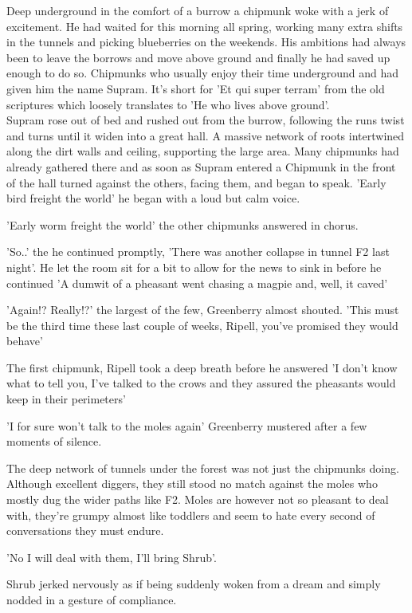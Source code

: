 \documentclass[smalldemyvopaper,11pt,twoside,onecolumn,openright,extrafontsizes]{memoir}
\begin{document}
Deep underground in the comfort of a burrow	a chipmunk woke with a jerk of excitement. He had waited for this morning all spring, working many extra shifts in the tunnels and picking blueberries on the weekends. His ambitions had always been to leave the borrows and move above ground and finally he had saved up enough to do so. Chipmunks who usually enjoy their time underground and had given him the name Supram. It's short for 'Et qui super terram' from the old scriptures which loosely translates to 'He who lives above ground'.\\

Supram rose out of bed and rushed out from the burrow, following the runs twist and turns until it widen into a great hall. A massive network of roots intertwined along the dirt walls and ceiling, supporting the large area. Many chipmunks had already gathered there and as soon as Supram entered a Chipmunk in the front of the hall turned against the others, facing them, and began to speak. 
'Early bird freight the world' he began with a loud but calm voice. 

'Early worm freight the world' the other chipmunks answered in chorus.

'So..' the he continued promptly, 'There was another collapse in tunnel F2 last night'. He let the room sit for a bit to allow for the news to sink in before he continued 'A dumwit of a pheasant went chasing a magpie and, well, it caved'

'Again!? Really!?' the largest of the few, Greenberry almost shouted. 
'This must be the third time these last couple of weeks, Ripell, you've promised they would behave'

The first chipmunk, Ripell took a deep breath before he answered
'I don't know what to tell you, I've talked to the crows and they assured the pheasants would keep in their perimeters'

'I for sure won't talk to the moles again' Greenberry mustered after a few moments of silence.

The deep network of tunnels under the forest was not just the chipmunks doing. Although excellent diggers, they still stood no match against the moles who mostly dug the wider paths like F2. Moles are however not so pleasant to deal with, they're grumpy almost like toddlers and seem to hate every second of conversations they must endure. 

'No I will deal with them, I'll bring Shrub'. 

Shrub jerked nervously as if being suddenly woken from a dream and simply nodded in a gesture of compliance. 
\end{document}
